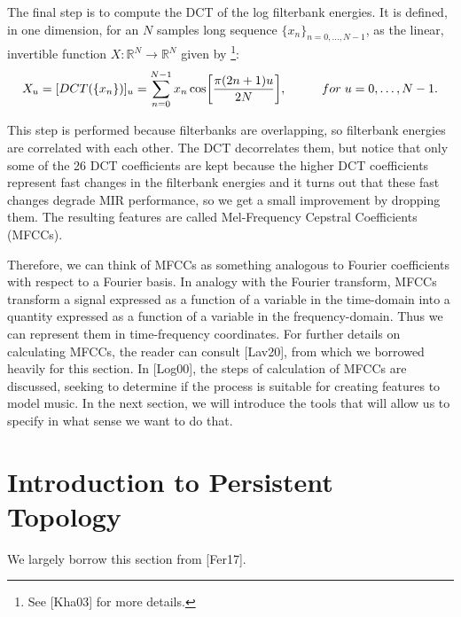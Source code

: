 \documentclass[english, LaM, oneside, noexaminfo]{sapthesis}
\begin{document}
The final step is to compute the DCT of the log filterbank energies. It is defined, in one dimension, for an $N$ samples long sequence $\{x_n\}_{n=0,...,N-1}$, as the linear, invertible function $X: \mathbb{R}^N \rightarrow \mathbb{R}^N$ given by \footnote{See [Kha03] for more details.}:
$$X_u=[DCT(\{x_n\})]_u = \sum_{n=0}^{N-1} x_n \cos \biggl[\frac{\pi (2n+1)u}{2N} \biggl], \hspace{1cm} for \hspace{0.1cm} u=0,\dots,N-1.$$

\noindent This step is performed because filterbanks are overlapping, so filterbank energies are correlated with each other. The DCT decorrelates them, but notice that only some of the 26 DCT coefficients are kept because the higher DCT coefficients represent fast changes in the filterbank energies and it turns out that these fast changes degrade MIR performance, so we get a small improvement by dropping them. The resulting features are called Mel-Frequency Cepstral Coefficients (MFCCs). 

Therefore, we can think of MFCCs as something analogous to Fourier coefficients with respect to a Fourier basis. In analogy with the Fourier transform, MFCCs transform a signal expressed as a function of a variable in the time-domain into a quantity expressed as a function of a variable in the frequency-domain. Thus we can represent them in time-frequency coordinates.
For further details on calculating MFCCs, the reader can consult [Lav20], from which we borrowed heavily for this section. 
In [Log00], the steps of calculation of MFCCs are discussed, seeking to determine if the process is suitable for creating features to model music. In the next section, we will introduce the tools that will allow us to specify in what sense we want to do that.






\section{Introduction to Persistent Topology}

We largely borrow this section from [Fer17].
\end{document}
